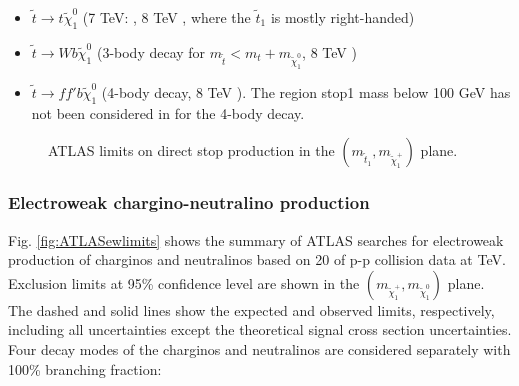 \begin{itemize}
\item $\tilde{t} \rightarrow t \tilde{\chi}^0_1$ (7 TeV: \cite{atlas:stoplim_1} \cite{atlas:stoplim_2} \cite{atlas:stoplim_3}, 8 TeV \cite{atlas:stoplim_4} \cite{atlas:stoplim_5} \cite{atlas:stoplim_6}, where the $\tilde{t}_1$ is mostly right-handed)


\item $\tilde{t} \rightarrow W b  \tilde{\chi}^0_1$ (3-body decay for $m_{\tilde{t}} < m_t + m_{\tilde{\chi}^0_1} $, 8 TeV \cite{atlas:stoplim_4}\cite{atlas:stoplim_6}) 

\item  $\tilde{t} \rightarrow f f' b  \tilde{\chi}^0_1$ (4-body decay, 8 TeV \cite{atlas:stoplim_4}\cite{atlas:stoplim_7}). The region stop1 mass below 100 GeV has not been considered in \cite{atlas:stoplim_4} for the 4-body decay. 

\end{itemize}

\begin{figure}[htbp]
\begin{center}
\end{center}
\caption[ATLAS limits on direct stop production]{ATLAS limits on direct stop production in the $\left( m_{\tilde{t}_1}, m_{\tilde{\chi}^+_1} \right)$ plane.}
\label{fig:ATLASstoplimits}
\end{figure}



\subsubsection{Electroweak chargino-neutralino production}

Fig. \ref{fig:ATLASewlimits} shows the summary of ATLAS searches for electroweak production of charginos and neutralinos based on 20 \ifb of p-p collision data at \cmotto TeV. Exclusion limits at 95\% confidence level are shown in the $\left( m_{\tilde{\chi}^+_1}, m_{\tilde{\chi}^0_1}  \right)$ plane. The dashed and solid lines show the expected and observed limits, respectively, including all uncertainties except the theoretical signal cross section uncertainties. Four decay modes of the charginos and neutralinos are considered separately with 100\% branching fraction: 


